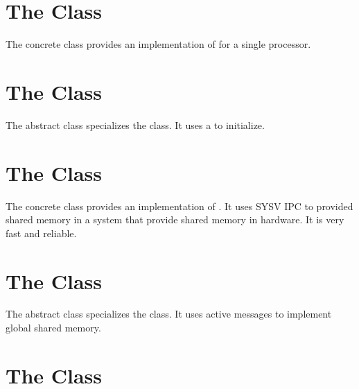 
\section{The  Class}
\label{ProcMemoryGrp}

The  concrete class provides an implementation of
 for a single processor.


\section{The  Class}
\label{MsgMemoryGrp}

The  abstract class specializes the 
class.  It uses a  to initialize.


\section{The  Class}
\label{ShmMemoryGrp}

The  concrete class provides an implementation of
.  It uses SYSV IPC to provided shared memory in a
system that provide shared memory in hardware.  It is very fast and
reliable.


\section{The  Class}
\label{ActiveMsgMemoryGrp}

The  abstract class specializes the
 class.  It uses active messages to implement global
shared memory.


\section{The  Class}
\label{PumaMemoryGrp}

